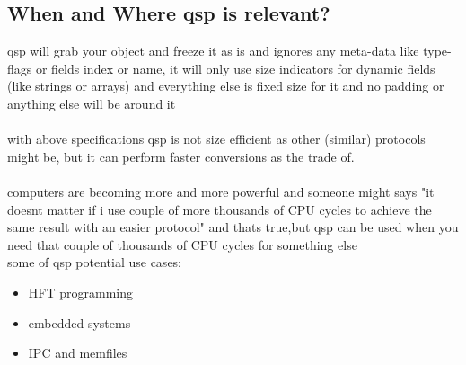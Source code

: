 \documentclass[11pt]{article}
\begin{document}
\subsection{When and Where qsp is relevant?}
qsp will grab your object and freeze it as is and ignores any meta-data like type-flags or fields index or name, it will only use size indicators for dynamic fields (like strings or arrays) and everything else is fixed size for it and no padding or anything else will be around it\\\\
with above specifications qsp is not size efficient as other (similar) protocols might be, but it can perform faster conversions as the trade of.\\\\
computers are becoming more and more powerful and someone might says "it doesnt matter if i use couple of more thousands of CPU cycles to achieve the same result with an easier protocol" and thats true,but qsp can be used when you need that couple of thousands of CPU cycles for something else\\
some of qsp potential use cases:
\begin{itemize}
	\item HFT programming
	\item embedded systems
	\item IPC and memfiles
\end{itemize}
\end{document}
